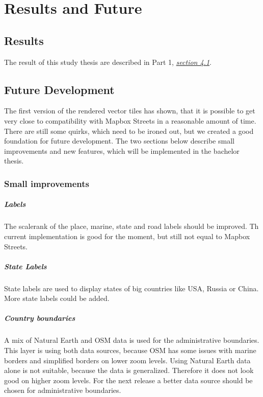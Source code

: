 \chapter{Results and Future}\label{part2_results_and_future}

\section{Results}\label{part2_results}
The result of this study thesis are described in Part 1, \hyperref[part1_results]{\emph{section 4.1}}.

\section{Future Development}\label{part2_future_development}
The first version of the rendered vector tiles has shown, that it is possible to get very close to compatibility with Mapbox Streets in a reasonable amount of time. There are still some quirks, which need to be ironed out, but we created a good foundation for future development. The two sections below describe small improvements and new features, which will be implemented in the bachelor thesis.

\subsection{Small improvements}\label{small_improvements}
 
\paragraph{Labels}
The scalerank of the place, marine, state and road labels should be improved. Th current implementation is good for the moment, but still not equal to Mapbox Streets.

\paragraph{State Labels}
State labels are used to display states of big countries like USA, Russia or China. More state labels could be added. 

\paragraph{Country boundaries}

A mix of Natural Earth and OSM data is used for the administrative boundaries.
This layer is using both data sources, because OSM has some issues with marine borders and simplified borders on lower zoom levels.
Using Natural Earth data alone is not suitable, because the data is generalized. Therefore it does not look good on higher zoom levels. For the next release a better data source should be chosen for administrative boundaries.

